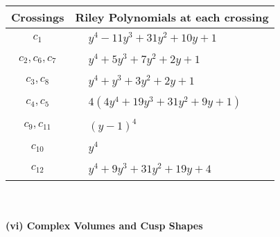 \documentclass[1p]{elsarticle_modified}
\theoremstyle{definition}
\begin{document}
\begin{tabular}{m{50pt}|m{274pt}}
Crossings & \hspace{64pt}Riley Polynomials at each crossing \\
\hline $$\begin{aligned}c_{1}\end{aligned}$$&$\begin{aligned}
&y^4-11 y^3+31 y^2+10 y+1
\end{aligned}$\\
\hline $$\begin{aligned}c_{2},c_{6},c_{7}\end{aligned}$$&$\begin{aligned}
&y^4+5 y^3+7 y^2+2 y+1
\end{aligned}$\\
\hline $$\begin{aligned}c_{3},c_{8}\end{aligned}$$&$\begin{aligned}
&y^4+y^3+3 y^2+2 y+1
\end{aligned}$\\
\hline $$\begin{aligned}c_{4},c_{5}\end{aligned}$$&$\begin{aligned}
&4(4 y^4+19 y^3+31 y^2+9 y+1)
\end{aligned}$\\
\hline $$\begin{aligned}c_{9},c_{11}\end{aligned}$$&$\begin{aligned}
&(y-1)^4
\end{aligned}$\\
\hline $$\begin{aligned}c_{10}\end{aligned}$$&$\begin{aligned}
&y^4
\end{aligned}$\\
\hline $$\begin{aligned}c_{12}\end{aligned}$$&$\begin{aligned}
&y^4+9 y^3+31 y^2+19 y+4
\end{aligned}$\\
\hline
\end{tabular}\\~\\
\newpage\flushleft \textbf{(vi) Complex Volumes and Cusp Shapes}
\end{document}

